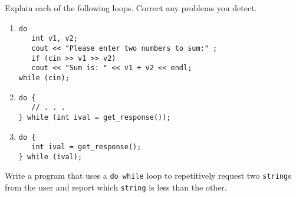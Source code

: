 %
%
\begin{question}
Explain each of the following loops. Correct any problems
you detect.
\begin{enumerate}[label=(\alph*)]
^^I\item
\begin{lstlisting}
do
   int v1, v2;
   cout << "Please enter two numbers to sum:" ;
   if (cin >> v1 >> v2)
   cout << "Sum is: " << v1 + v2 << endl;
while (cin);
\end{lstlisting}

^^I\item
\begin{lstlisting}
do {
   // . . .
} while (int ival = get_response());
\end{lstlisting}

^^I\item
\begin{lstlisting}
do {
   int ival = get_response();
} while (ival);
\end{lstlisting}
\end{enumerate}
\end{question}

\begin{question}
Write a program that uses a \verb|do while| loop to repetitively
request two \verb|string|s from the user and report which \verb|string| is less than
the other.
\end{question}
